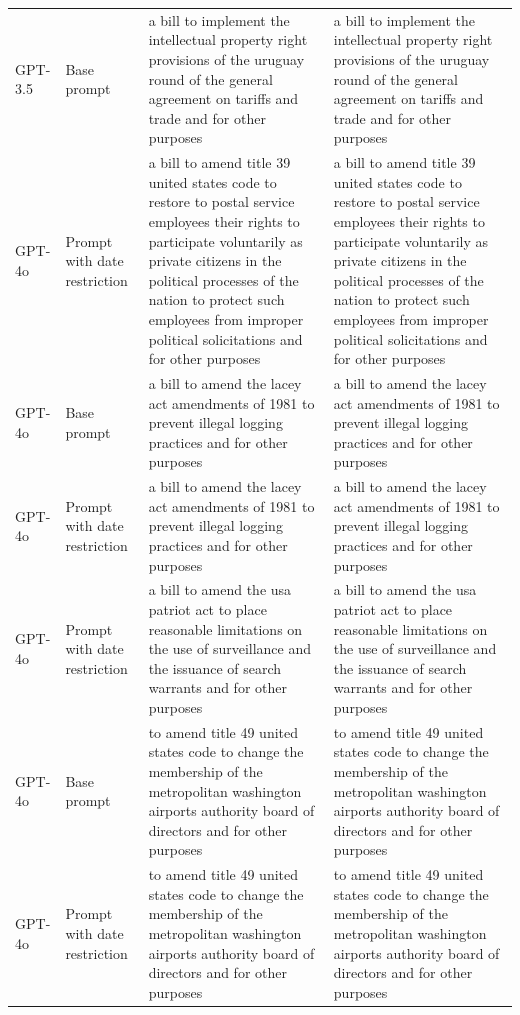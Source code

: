 \begin{longtable}{>{\raggedright\arraybackslash}p{1.4cm}>{\raggedright\arraybackslash}p{1.4cm}>{\raggedright\arraybackslash}p{5.5cm}>{\raggedright\arraybackslash}p{5.5cm}}
GPT-3.5 & Base prompt & a bill to implement the intellectual property right provisions of the uruguay round of the general agreement on tariffs and trade and for other purposes & a bill to implement the intellectual property right provisions of the uruguay round of the general agreement on tariffs and trade and for other purposes\\
GPT-4o & Prompt with date restriction & a bill to amend title 39 united states code to restore to postal service employees their rights to participate voluntarily as private citizens in the political processes of the nation to protect such employees from improper political solicitations and for other purposes & a bill to amend title 39 united states code to restore to postal service employees their rights to participate voluntarily as private citizens in the political processes of the nation to protect such employees from improper political solicitations and for other purposes\\
GPT-4o & Base prompt & a bill to amend the lacey act amendments of 1981 to prevent illegal logging practices and for other purposes & a bill to amend the lacey act amendments of 1981 to prevent illegal logging practices and for other purposes\\
GPT-4o & Prompt with date restriction & a bill to amend the lacey act amendments of 1981 to prevent illegal logging practices and for other purposes & a bill to amend the lacey act amendments of 1981 to prevent illegal logging practices and for other purposes\\
GPT-4o & Prompt with date restriction & a bill to amend the usa patriot act to place reasonable limitations on the use of surveillance and the issuance of search warrants and for other purposes & a bill to amend the usa patriot act to place reasonable limitations on the use of surveillance and the issuance of search warrants and for other purposes\\
GPT-4o & Base prompt & to amend title 49 united states code to change the membership of the metropolitan washington airports authority board of directors and for other purposes & to amend title 49 united states code to change the membership of the metropolitan washington airports authority board of directors and for other purposes\\
GPT-4o & Prompt with date restriction & to amend title 49 united states code to change the membership of the metropolitan washington airports authority board of directors and for other purposes & to amend title 49 united states code to change the membership of the metropolitan washington airports authority board of directors and for other purposes\\

\end{longtable}

